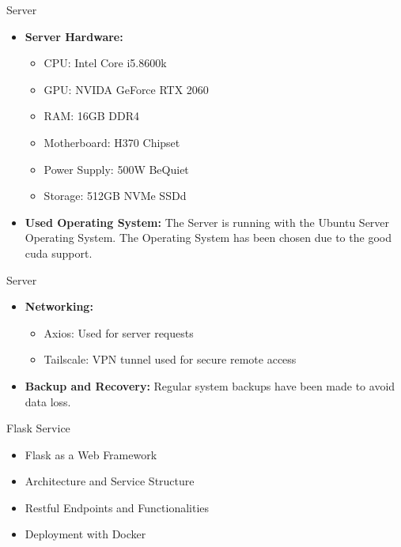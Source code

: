 \documentclass{beamer}
\begin{document}
\begin{frame}
  \maketitle
\end{frame}

\begin{frame}{Server}
  \begin{itemize}
    \item \textbf{Server Hardware:}
      \begin{itemize}
        \item CPU: Intel Core i5.8600k
        \item GPU: NVIDA GeForce RTX 2060
        \item RAM: 16GB DDR4 
        \item Motherboard: H370 Chipset
        \item Power Supply: 500W BeQuiet
        \item Storage: 512GB NVMe SSDd
      \end{itemize}
    \item \textbf{Used Operating System:} The Server is running with the Ubuntu Server Operating System. The Operating System has been chosen due to the good cuda support. 

  \end{itemize}
\end{frame}

\begin{frame}{Server}
  \begin{itemize}
    \item \textbf{Networking:}
      \begin{itemize}
        \item Axios: Used for server requests 
        \item Tailscale: VPN tunnel used for secure remote access 
      \end{itemize}
    \item \textbf{Backup and Recovery:} Regular system backups have been made to avoid data loss.      
  \end{itemize}
\end{frame}

\begin{frame}{Flask Service}
  \begin{itemize}
    \item Flask as a Web Framework
    \item Architecture and Service Structure
    \item Restful Endpoints and Functionalities
    \item Deployment with Docker
  \end{itemize}
\end{frame}
\end{document}
